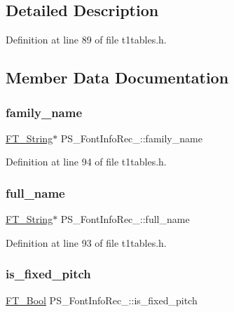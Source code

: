 \subsection{Detailed Description}


Definition at line 89 of file t1tables.\+h.



\subsection{Member Data Documentation}
\mbox{\label{struct_p_s___font_info_rec___ac54d883f153a495f9a20dc043ed434cf}} 
\subsubsection{\texorpdfstring{family\_name}{family\_name}}
{\footnotesize\ttfamily \mbox{\hyperlink{fttypes_8h_a9846214585359eb2ba6bbb0e6de30639}{F\+T\+\_\+\+String}}$\ast$ P\+S\+\_\+\+Font\+Info\+Rec\+\_\+\+::family\+\_\+name}



Definition at line 94 of file t1tables.\+h.

\mbox{\label{struct_p_s___font_info_rec___a039dbf76ccc1b63b03e77215cb4b430b}} 
\subsubsection{\texorpdfstring{full\_name}{full\_name}}
{\footnotesize\ttfamily \mbox{\hyperlink{fttypes_8h_a9846214585359eb2ba6bbb0e6de30639}{F\+T\+\_\+\+String}}$\ast$ P\+S\+\_\+\+Font\+Info\+Rec\+\_\+\+::full\+\_\+name}



Definition at line 93 of file t1tables.\+h.

\mbox{\label{struct_p_s___font_info_rec___a68e2d0913fe910ea86d558a4a426412a}} 
\subsubsection{\texorpdfstring{is\_fixed\_pitch}{is\_fixed\_pitch}}
{\footnotesize\ttfamily \mbox{\hyperlink{fttypes_8h_a1a832a256bb5a7e6e884afaa1a07f3ae}{F\+T\+\_\+\+Bool}} P\+S\+\_\+\+Font\+Info\+Rec\+\_\+\+::is\+\_\+fixed\+\_\+pitch}



